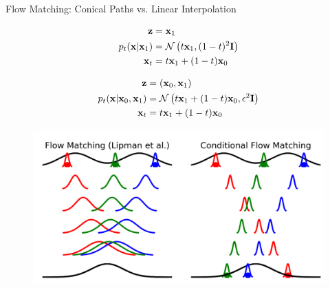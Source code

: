 \documentclass{beamer}
\begin{document}
\begin{frame}{Flow Matching: Conical Paths vs. Linear Interpolation}
	\begin{minipage}[t]{0.5\columnwidth}
		\begin{align*}
			\mathbf{z} & = \mathbf{x}_1 \\
			p_t(\mathbf{x} | \mathbf{x}_1) &= \mathcal{N}\left(t \mathbf{x}_1, (1-t)^2 \mathbf{I}\right) \\
			\mathbf{x}_t &= t \mathbf{x}_1 + (1 - t) \mathbf{x}_0 
		\end{align*}
	\end{minipage}%
	\begin{minipage}[t]{0.5\columnwidth}
		\begin{align*}
			\mathbf{z} & = (\mathbf{x}_0, \mathbf{x}_1) \\
			p_t(\mathbf{x} | \mathbf{x}_0, \mathbf{x}_1) &= \mathcal{N}\left(t \mathbf{x}_1 + (1 - t) \mathbf{x}_0, \epsilon^2 \mathbf{I}\right) \\
			\mathbf{x}_t &= t \mathbf{x}_1 + (1 - t) \mathbf{x}_0
		\end{align*}
	\end{minipage}
	\begin{figure}
		\centering
		\includegraphics[width=0.8\linewidth]{figs/compare_conditionings}
	\end{figure}
\end{frame}
\end{document}
